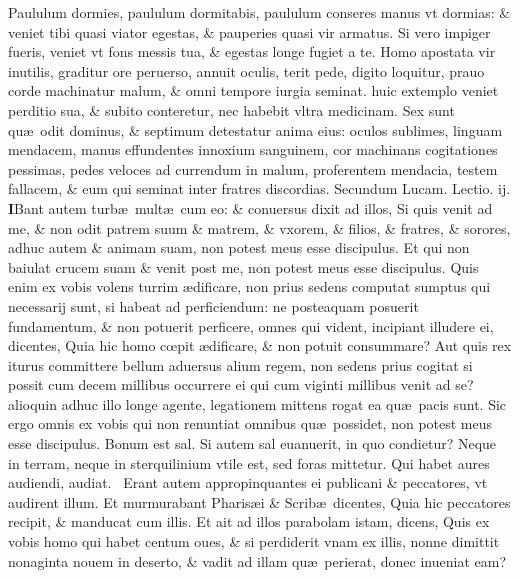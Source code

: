 \documentclass[a5paper,10pt]{book}
\def\leftmarginnote{%
	\lrmarginnote{\hskip -\marginparsep \hskip -6.5em}}
\def\rightmarginnote{%
	\lrmarginnote{\hskip\columnwidth \hskip -1em}}
\def\ae{æ}
\def\oe{œ}
\begin{document}
\begin{multicols*}{2}
Paululum dormies, paululum dormitabis, paululum conseres manus vt dormias: \& veniet tibi quasi viator egestas, \& pauperies quasi vir armatus.
Si vero impiger fueris, veniet vt fons messis tua, \& egestas longe fugiet a te.
Homo apostata vir inutilis, graditur ore peruerso, annuit oculis, terit pede, digito loquitur, prauo corde machinatur malum, \& omni tempore iurgia seminat. huic extemplo veniet perditio sua, \& subito conteretur, nec habebit vltra medicinam.
Sex sunt qu\ae \ odit dominus, \& septimum detestatur anima eius: oculos sublimes, linguam mendacem, manus effundentes innoxium sanguinem, cor machinans cogitationes pessimas, pedes veloces ad currendum in malum, proferentem mendacia, testem fallacem, \& eum qui seminat inter fratres discordias.
\newline \color{red} Secundum Lucam. \hfill Lectio. ij. \color{black}
\vspace{-.25em}
\lettrine[lines=2]{\bfseries \color{red} I}{}Bant\rightmarginnote{c. 14.} autem turb\ae \ mult\ae \ cum eo: \& conuersus dixit ad illos, Si quis venit ad me, \& non odit patrem suum \& matrem, \& vxorem, \& filios, \& fratres, \& sorores, adhuc autem \& animam suam, non potest meus esse discipulus.
Et qui non baiulat crucem suam \& venit post me, non potest meus esse discipulus.
Quis enim ex vobis volens turrim \ae dificare, non prius sedens computat sumptus qui
necessarij sunt, si habeat ad perficiendum: ne posteaquam posuerit fundamentum, \& non potuerit perficere, omnes qui vident, incipiant illudere ei, dicentes, Quia hic homo c\oe pit \ae dificare, \& non potuit consummare?
Aut quis rex iturus committere bellum aduersus alium regem, non sedens prius cogitat si possit cum decem millibus occurrere ei qui cum viginti millibus venit ad se? alioquin adhuc illo longe agente, legationem mittens rogat ea qu\ae \ pacis sunt.
Sic ergo omnis ex vobis qui non renuntiat omnibus qu\ae \ possidet, non potest meus esse discipulus.
Bonum est sal. Si autem sal euanuerit, in quo condietur?
Neque in terram, neque in sterquilinium vtile est, sed foras mittetur. Qui habet aures audiendi, audiat. \textdagger \ 
Erant\leftmarginnote{\begin{flushright}c. 15.\\a\end{flushright}} autem appropinquantes ei publicani \& peccatores, vt audirent illum.
Et murmurabant Pharis\ae i \& Scrib\ae \ dicentes, Quia hic peccatores recipit, \& manducat cum illis.
Et ait ad illos parabolam istam, dicens, Quis ex vobis homo qui habet centum oues, \& si perdiderit vnam ex illis, nonne dimittit nonaginta nouem in deserto, \& vadit ad illam qu\ae \ perierat, donec inueniat eam?

\end{multicols*}
\end{document}
